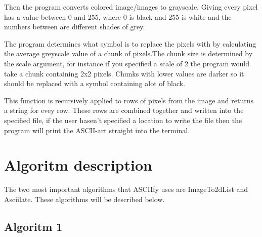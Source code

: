 \documentclass[12pt, a4paper]{article}
\begin{document}
	Then the program converts colored image/images to grayscale. Giving every pixel has a value between 0 and 255, where 0 is black and 255 is white and the numbers between are different shades of grey.

	The program determines what symbol is to replace the pixels with by calculating the average greyscale value of a chunk of pixels.The chunk size is determined by the scale argument, for instance if you specified a scale of 2 the program would take a chunk containing 2x2 pixels. Chunks with lower values are darker so it should be replaced with a symbol containing alot of black.

	This function is recursively applied to rows of pixels from the image and returns a string for evey row.  These rows are combined together and written into the specified file, if the user hasen't specified a location to write the file then the program will print the ASCII-art straight into the terminal.






	\section{Algoritm description}

	The two most important algorithms that ASCIIfy uses are ImageTo2dList and Asciilate. These algorithms will be described below.

		\subsection{Algoritm 1}
\end{document}
